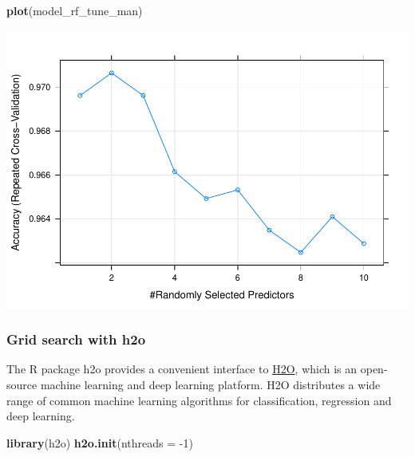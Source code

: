\documentclass[]{article}
\newenvironment{Shaded}{\begin{snugshade}}{\end{snugshade}}
\newcommand{\KeywordTok}[1]{\textcolor[rgb]{0.13,0.29,0.53}{\textbf{{#1}}}}
\newcommand{\DataTypeTok}[1]{\textcolor[rgb]{0.13,0.29,0.53}{{#1}}}
\newcommand{\DecValTok}[1]{\textcolor[rgb]{0.00,0.00,0.81}{{#1}}}
\newcommand{\NormalTok}[1]{{#1}}
\begin{document}
\begin{Shaded}
\begin{Highlighting}[]
\KeywordTok{plot}\NormalTok{(model_rf_tune_man)}
\end{Highlighting}
\end{Shaded}

\includegraphics{webinar_code_files/figure-latex/unnamed-chunk-41-1.pdf}

\subsubsection{Grid search with h2o}\label{grid-search-with-h2o}

The R package h2o provides a convenient interface to
\href{http://www.h2o.ai/h2o/}{H2O}, which is an open-source machine
learning and deep learning platform. H2O distributes a wide range of
common machine learning algorithms for classification, regression and
deep learning.

\begin{Shaded}
\begin{Highlighting}[]
\KeywordTok{library}\NormalTok{(h2o)}
\KeywordTok{h2o.init}\NormalTok{(}\DataTypeTok{nthreads =} \NormalTok{-}\DecValTok{1}\NormalTok{)}
\end{Highlighting}
\end{Shaded}
\end{document}
